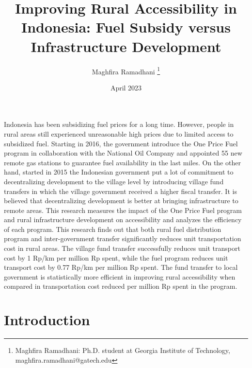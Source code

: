 \documentclass[letterpaper,12pt,leqno]{article}
\begin{document}
\title{Improving Rural Accessibility in Indonesia: Fuel Subsidy versus Infrastructure Development}
\author{Maghfira Ramadhani
\thanks{Maghfira Ramadhani: Ph.D. student at Georgia Institute of Technology, maghfira.ramadhani@gatech.edu}}
\date{April 2023}                       
\begin{titlepage}\maketitle

Indonesia has been subsidizing fuel prices for a long time. However, people in rural areas still experienced unreasonable high prices due to limited access to subsidized fuel. Starting in 2016, the government introduce the One Price Fuel program in collaboration with the National Oil Company and appointed 55 new remote gas stations to guarantee fuel availability in the last miles. On the other hand, started in 2015 the Indonesian government put a lot of commitment to decentralizing development to the village level by introducing village fund transfers in which the village government received a higher fiscal transfer. It is believed that decentralizing development is better at bringing infrastructure to remote areas. This research measures the impact of the One Price Fuel program and rural infrastructure development on accessibility and analyzes the efficiency of each program. This research finds out that both rural fuel distribution program and inter-government transfer significantly reduces unit transportation cost in rural areas. The village fund transfer successfully reduces unit transport cost by 1 Rp/km per million Rp spent, while the fuel program reduces unit transport cost by 0.77 Rp/km per million Rp spent. The fund transfer to local government is statistically more efficient in improving rural accessibility when compared in transportation cost reduced per million Rp spent in the program.

\end{titlepage}\section{Introduction}\label{s:introduction}
 
\end{document}
